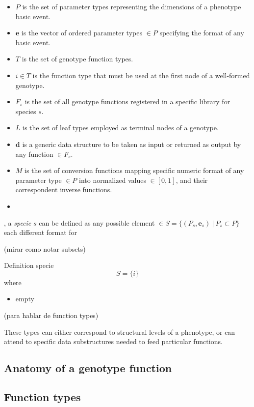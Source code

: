 \documentclass{article}
\renewcommand{\vec}[1]{\mathbf{#1}}
\begin{document}
\begin{itemize}
\item $P$ is the set of parameter types representing the dimensions of a phenotype basic event.
\item $\vec{e}$ is the vector of ordered parameter types $\in P$ specifying the format of any basic event. 
\item $T$ is the set of genotype function types. 
\item $i \in T$ is the function type that must be used at the first node of a well-formed genotype.
\item $F_s$ is the set of all genotype functions registered in a specific library for species $s$.
\item $L$ is the set of leaf types employed as terminal nodes of a genotype.
\item $\vec{d}$ is a generic data structure to be taken as input or returned as output by any function $\in F_s$.
\item $M$ is the set of conversion functions mapping specific numeric format of any parameter type $\in P$ into normalized values $\in [0,1]$, and their correspondent inverse functions.
\item 
\end{itemize}


, a \emph{specie} $s$ can be defined as any possible element $\in S = \{(P_s, \vec{e}_s) \: | \: P_s\subset P \}$ each different format for 

(mirar como notar subsets)

Definition specie $$S = \{i\}$$ where

\begin{itemize}
\item empty
\end{itemize}

(para hablar de function types)

These types can either correspond to structural levels of a phenotype, or can attend to specific data substructures needed to feed particular functions.

\subsection{Anatomy of a genotype function}

\subsection{Function types}
\end{document}
